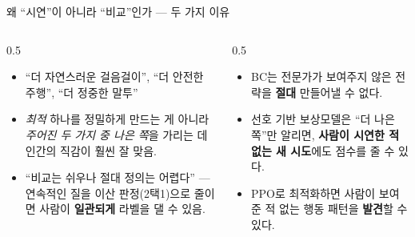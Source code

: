 \begin{frame}{왜 ``시연''이 아니라 ``비교''인가 — 두 가지 이유}
  \begin{columns}[T]
    \begin{column}{0.5\textwidth}
      \begin{itemize}
        \item ``더 자연스러운 걸음걸이'', ``더 안전한 주행'',
          ``더 정중한 말투''
        \item \textit{최적} 하나를 정밀하게 만드는 게 아니라
          \textit{주어진 두 가지 중 나은 쪽}을 가리는 데 인간의
          직감이 훨씬 잘 맞음.
        \item ``비교는 쉬우나 절대 정의는 어렵다'' — 연속적인 질을
          이산 판정(2택1)으로 줄이면 사람이 \textbf{일관되게}
          라벨을 댈 수 있음.
      \end{itemize}
    \end{column}
    \begin{column}{0.5\textwidth}
      \begin{itemize}
        \item BC는 전문가가 보여주지 않은 전략을 \textbf{절대}
          만들어낼 수 없다.
        \item 선호 기반 보상모델은 ``더 나은 쪽''만 알리면,
          \textbf{사람이 시연한 적 없는 새 시도}에도 점수를 줄 수
          있다.
        \item PPO로 최적화하면 사람이 보여준 적 없는 행동 패턴을
          \textbf{발견}할 수 있다.
      \end{itemize}
    \end{column}
  \end{columns}
\end{frame}
